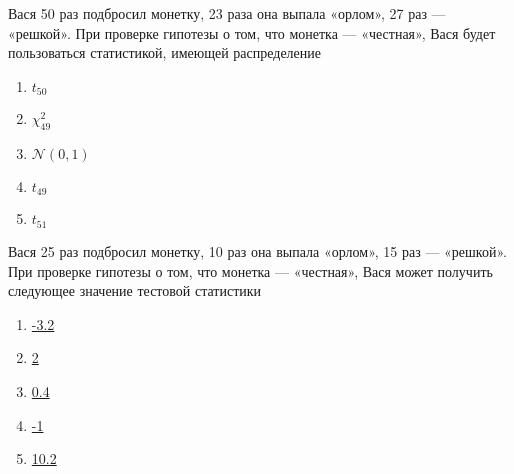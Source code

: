 \documentclass[t]{beamer}
\newcommand{\cN}{\mathcal{N}}
\begin{document}
 \begin{frame} \label{38} 
\begin{block}{38} 

Вася 50 раз подбросил монетку, 23 раза она выпала «орлом», 27 раз — «решкой». При проверке гипотезы о том, что монетка — «честная», Вася будет пользоваться статистикой, имеющей распределение


 \end{block} 
\begin{enumerate} 
\item[] \hyperlink{38-No}{\beamergotobutton{} $t_{50}$}
\item[] \hyperlink{38-No}{\beamergotobutton{} $\chi^2_{49}$}
\item[] \hyperlink{38-Yes}{\beamergotobutton{} $\cN(0,1)$}
\item[] \hyperlink{38-No}{\beamergotobutton{} $t_{49}$}
\item[] \hyperlink{38-No}{\beamergotobutton{} $t_{51}$}
\end{enumerate} 
\end{frame} 


 \begin{frame} \label{39} 
\begin{block}{39} 

Вася 25 раз подбросил монетку, 10 раз она выпала «орлом», 15 раз — «решкой».
При проверке гипотезы о том, что монетка — «честная»,
Вася может получить следующее значение тестовой статистики


 \end{block} 
\begin{enumerate} 
\item[] \hyperlink{39-No}{\beamergotobutton{} -3.2}
\item[] \hyperlink{39-No}{\beamergotobutton{} 2}
\item[] \hyperlink{39-No}{\beamergotobutton{} 0.4}
\item[] \hyperlink{39-Yes}{\beamergotobutton{} -1}
\item[] \hyperlink{39-No}{\beamergotobutton{} 10.2}
\end{enumerate} 
\end{frame} 
\end{document}
